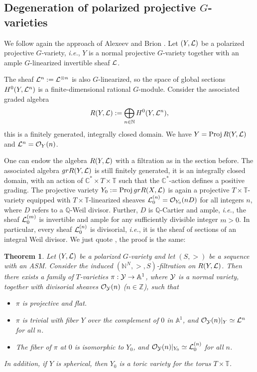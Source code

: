 \documentclass{emsprocart}
\newtheorem{theorem}{Theorem}[section]
\theoremstyle{definition}
\begin{document}
\subsection{Degeneration of polarized projective \texorpdfstring{$G$}{G}-varieties}
We follow again the approach of Alexeev and Brion \cite{AB}.
Let $(Y,\cal L)$ be a  polarized projective $G$-variety, \emph{i.e.}, $Y$ is a normal projective $G$-variety together with an
ample $G$-linearized  invertible sheaf $\cal L$.

The sheaf ${\cal L}^n := {\cal L}^{\otimes n}$ is also $G$-linearized, so the space
of global sections $H^0(Y,{\cal L}^n)$ is a finite-dimensional rational $G$-module.
Consider the associated graded algebra
$$
R(Y,{\cal L}):= \bigoplus_{n\in\mathbb N} H^0(Y,{\cal L}^n),
$$
this is a finitely generated, integrally closed domain. We have $Y = \hbox{Proj\,} R(Y,{\cal L})$ and
${\cal L}^n={\cal O}_Y(n)$.

One can endow the algebra $R(Y,{\cal L})$ with a filtration as in the section before.
The associated algebra $gr R(Y,{\cal L})$ is still finitely generated, it is an
integrally closed domain, with an action of $\mathbb C^*\times T \times \mathbb T$
such that the $\mathbb C^*$-action defines a positive grading.
The projective variety $Y_0 :=\hbox{Proj\,} gr R(X,\cal L)$ is again
a projective $T\times\mathbb  T$-variety equipped with $T\times\mathbb  T$-linearized sheaves
${\cal L}_0^{(n)}={\cal O}_{Y_0}(n D)$ for all integers $n$, where $D$ refers to a $\mathbb Q$-Weil divisor.
Further, $D$ is $\mathbb Q$-Cartier and ample, \emph{i.e.}, the sheaf ${\cal L}_0^{(m)}$
 is invertible and ample for any sufficiently divisible integer $m > 0$.
In particular, every sheaf ${\cal L}_0^{(n)}$ is divisorial, \emph{i.e.}, it is the sheaf of sections of an integral Weil divisor.
We just quote \cite{AB}, the proof is the same:
\begin{theorem}\it
Let $(Y,\cal L)$ be a  polarized $G$-variety and let
$(S,>)$ be a sequence with an ASM. Consider the
induced $(\mathbb N^N,>,S)$-{\it filtration} on $R(Y,{\cal L})$.
Then there exists a family of $T$-varieties $\pi : {\cal Y}\rightarrow \mathbb A^1$, where ${\cal Y}$ is a
normal variety, together with divisorial sheaves ${\cal O}_{\cal Y}(n)$ ($n\in\mathbb  Z$), such that
\begin{itemize}
\item[{\it i)}] $\pi$ is projective and flat.
\item[{\it ii)}] $\pi$ is trivial with fiber $Y$ over the complement of $0$ in $\mathbb A^1$, and ${\cal O}_{\cal Y}(n)\vert_Y \simeq {\cal L}^n$
for all $n$.
\item[{\it iii)}]  The fiber of $\pi$ at $0$ is isomorphic to $Y_0$, and ${\cal O}_{\cal Y}(n)\vert_{Y_0} \simeq {\cal L}_0^{(n)}$ for all $n$.
\end{itemize}
In addition, if $Y$ is spherical, then $Y_0$ is a toric variety for the torus $T\times\mathbb T$.
\end{theorem}
\end{document}
